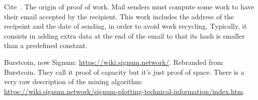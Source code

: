 Cite~\cite{DworkN92}. The origin of proof of work. Mail senders must compute some
work to have their email accepted by the recipient. This work includes
the address of the recipeint and the date of sending, in order to avoid
work recycling. Typically, it consists in adding extra data at the end of the email
to that its hash is smaller than a predefined constant.

Burstcoin, now Signum: \url{https://wiki.signum.network/}. Rebranded from Burstcoin.
They call it proof of capacity but it's just proof of space.
There is a very raw description of the mining algorithm:
\url{https://wiki.signum.network/signum-plotting-technical-information/index.htm}.
